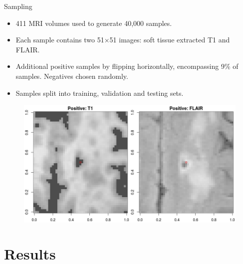 \documentclass{beamer}
\begin{document}
\begin{frame}{Sampling}
\begin{itemize}
\item 411 MRI volumes used to generate 40,000 samples.
\item Each sample contains two 51$\times$51 images: soft tissue extracted T1 and FLAIR.
\item Additional positive samples by flipping horizontally, encompassing 9\% of samples. Negatives chosen randomly.
\item Samples split into training, validation and testing sets.
\end{itemize}
\begin{figure}
\centering
\includegraphics[scale=0.37]{../Thesis_Docs/Images/6_positive.png}
\end{figure}
\end{frame}


\section{Results}
\end{document}
